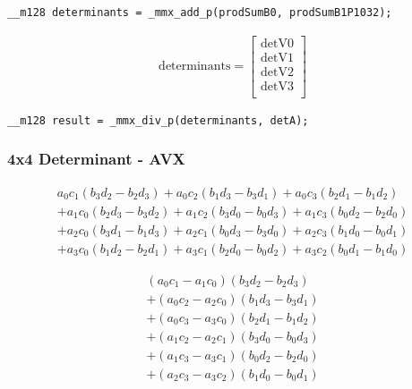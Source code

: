 \documentclass[]{scrartcl}
\newcommand{\pth}[1]{\left(#1\right)}
\begin{document}
\begin{verbatim}
__m128 determinants = _mmx_add_p(prodSumB0, prodSumB1P1032);
\end{verbatim}


\begin{align*}
\mathrm{determinants} 
=
\begin{bmatrix}
\mathrm{detV0}\\
\mathrm{detV1}\\
\mathrm{detV2}\\
\mathrm{detV3}\\
\end{bmatrix}
\end{align*}

\begin{verbatim}
__m128 result = _mmx_div_p(determinants, detA);
\end{verbatim}


\subsubsection{4x4 Determinant - AVX}
\label{sec:determinant4x4AVX}

\begin{align*}
  a_0c_1 \pth{b_3d_2 - b_2d_3}
+ a_0c_2 \pth{b_1d_3 - b_3d_1}            
+ a_0c_3 \pth{b_2d_1 - b_1d_2}\\
+ a_1c_0 \pth{b_2d_3 - b_3d_2}
+ a_1c_2 \pth{b_3d_0 - b_0d_3}
+ a_1c_3 \pth{b_0d_2 - b_2d_0}\\
+ a_2c_0 \pth{b_3d_1 - b_1d_3}
+ a_2c_1 \pth{b_0d_3 - b_3d_0}
+ a_2c_3 \pth{b_1d_0 - b_0d_1}\\
+ a_3c_0 \pth{b_1d_2 - b_2d_1}
+ a_3c_1 \pth{b_2d_0 - b_0d_2}
+ a_3c_2 \pth{b_0d_1 - b_1d_0}
\end{align*}

\begin{align*}
  \pth{a_0c_1 - a_1c_0} \pth{b_3d_2 - b_2d_3} \\
+ \pth{a_0c_2 - a_2c_0} \pth{b_1d_3 - b_3d_1} \\
+ \pth{a_0c_3 - a_3c_0} \pth{b_2d_1 - b_1d_2} \\
+ \pth{a_1c_2 - a_2c_1} \pth{b_3d_0 - b_0d_3} \\
+ \pth{a_1c_3 - a_3c_1} \pth{b_0d_2 - b_2d_0} \\ 
+ \pth{a_2c_3 - a_3c_2} \pth{b_1d_0 - b_0d_1} \\ 
\end{align*}
\end{document}
